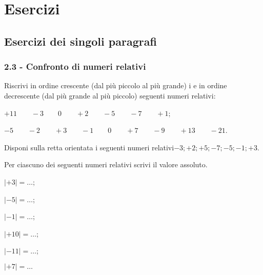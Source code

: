 \section{Esercizi}
\subsection{Esercizi dei singoli paragrafi}
\subsubsection*{2.3 - Confronto di numeri relativi}


\begin{esercizio}
 \label{ese:2.1}
Riscrivi in ordine crescente (dal più piccolo al più grande) i e in ordine decrescente (dal più grande al più piccolo) seguenti numeri relativi:
\begin{enumeratea}
\item $ +11\qquad-3\qquad0\qquad+2\qquad-5\qquad-7\qquad+1 $;
\item $ -5\qquad-2\qquad+3\qquad-1\qquad0\qquad+7\qquad-9\qquad+13\qquad-21 $.
\end{enumeratea}
\end{esercizio}

\begin{esercizio}
 \label{ese:2.2}
Disponi sulla retta orientata i seguenti numeri relativi$-3; +2; +5; -7; -5; -1; +3$.
\begin{center}
 
\end{center}

\end{esercizio}

\begin{esercizio}
 \label{ese:2.3}
Per ciascuno dei seguenti numeri relativi scrivi il valore assoluto.
\begin{multicols}{3}
\begin{enumeratea}
 \item $|+3|=\ldots$;
 \item $|-5|=\ldots$;
 \item $|-1|=\ldots$;
 \item $|+10|=\ldots$;
 \item $|-11|=\ldots$;
 \item $|+7|=\ldots$
\end{enumeratea}
\end{multicols}
\end{esercizio}

